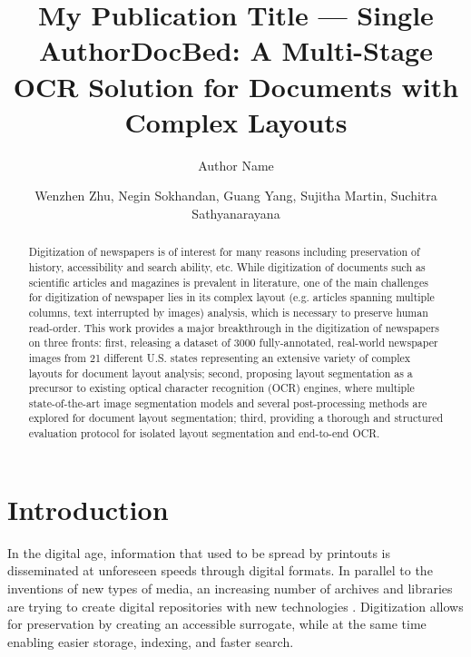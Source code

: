 \documentclass[letterpaper]{article} %
\title{My Publication Title --- Single Author}
\author {
    Author Name
}
\title{\title{DocBed: A Multi-Stage OCR Solution for Documents with Complex Layouts}}
\author {
    Wenzhen Zhu,
    Negin Sokhandan,
    Guang Yang,
    Sujitha Martin,
    Suchitra Sathyanarayana
}
\begin{document}
\maketitle

\begin{abstract}
Digitization of newspapers is of interest for many reasons including preservation of history, accessibility and search ability, etc. While digitization of documents such as scientific articles and magazines is prevalent in literature, one of the main challenges for digitization of newspaper lies in its complex layout (e.g. articles spanning multiple columns, text interrupted by images) analysis, which is necessary to preserve human read-order. This work provides a major breakthrough in the digitization of newspapers on three fronts: first, releasing a dataset of 3000 fully-annotated, real-world newspaper images from 21 different U.S. states representing an extensive variety of complex layouts for document layout analysis; second, proposing layout segmentation as a precursor to existing optical character recognition (OCR) engines, where multiple state-of-the-art image segmentation models and several post-processing methods are explored for document layout segmentation; third, providing a thorough and structured evaluation protocol for isolated layout segmentation and end-to-end OCR.

\end{abstract}

\section{Introduction}
In the digital age, information that used to be spread by printouts is disseminated at unforeseen speeds through digital formats. In parallel to the inventions of new types of media, an increasing number of archives and libraries are trying to create digital repositories with new technologies \cite{DBLP:journals/firstmonday/Cox07}. Digitization allows for preservation by creating an accessible surrogate, while at the same time enabling easier storage, indexing, and faster search.

\end{document}
